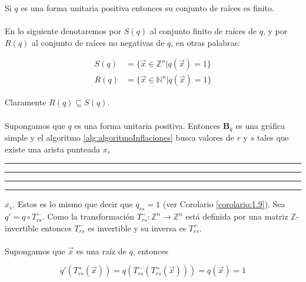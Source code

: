\begin{lemma}
Si $q$ es una forma unitaria positiva entonces su conjunto de raíces es finito.
\label{lema:2.4}
\end{lemma}

\paragraph{}
En lo siguiente denotaremos por $S(q)$ al conjunto finito de raíces de $q$, y por $R(q)$ al conjunto de raíces no negativas de $q$, en otras palabras:

\begin{equation*}
\begin{split}
S(q) & =\{ \overrightarrow{x} \in \mathbb{Z}^{n} | q\left(\overrightarrow{x}\right) = 1 \}\\
R(q) & = \{ \overrightarrow{x} \in \mathbb{N}^{n} | q\left(\overrightarrow{x}\right) = 1 \}
\end{split}
\end{equation*}

Claramente $R(q) \subseteq S(q)$.

\paragraph{}
Supongamos que $q$ es una forma unitaria positiva. Entonces $\textbf{B}_{q}$ es una gráfica simple y el algoritmo \ref{alg:algoritmoInflaciones} busca valores de $r$ y $s$ tales que existe una arista punteada $x_{r}$ \rule[1mm]{.1cm}{0.4pt} \rule[1mm]{.1cm}{0.4pt} \rule[1mm]{.1cm}{0.4pt} \rule[1mm]{.1cm}{0.4pt} $x_{s}$. Estos es lo mismo que decir que $q_{rs} = 1$ (ver Corolario \ref{corolario:1.9}). Sea $q' = q \circ T_{rs}^{-} $. Como la transformación $T_{rs}^{-}: \mathbb{Z}^{n} \rightarrow \mathbb{Z}^{n}$ está definida por una matriz $\mathbb{Z}$-invertible entonces $T_{rs}^{-}$ es invertible y su inversa es $T_{rs}^{+}$.

\paragraph{}
Supongamos que $\overrightarrow{x}$ es una raíz de $q$, entonces

\begin{equation*}
q'\left(T_{rs}^{+}\left(\overrightarrow{x}\right)\right) = q\left(T_{rs}^{-}\left(T_{rs}^{+} \left(\overrightarrow{x}\right)\right)\right) = q\left(\overrightarrow{x}\right) = 1
\end{equation*}

